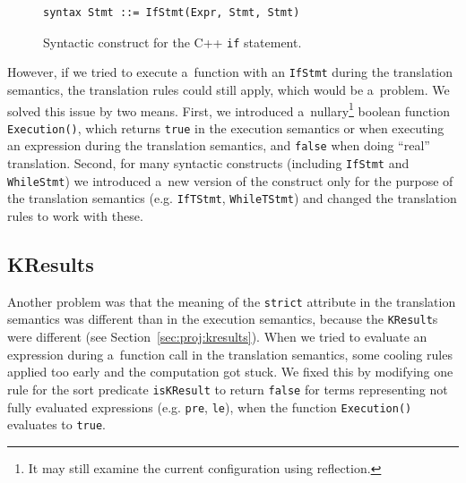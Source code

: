 \documentclass[nolot,nolof,nocover,printed]{fithesis3}
\begin{document}
\begin{figure}[ht]
\begin{lstlisting}
syntax Stmt ::= IfStmt(Expr, Stmt, Stmt)
\end{lstlisting}
\caption{Syntactic construct for the C++ \lstinline|if| statement.}
\label{fig:ifStmt}
\end{figure}

However, if we tried to execute a~function with an \lstinline|IfStmt| during the translation semantics, the translation rules could still apply, which would be a~problem. We solved this issue by two means. First, we introduced a~nullary\footnote{It may still examine the current configuration using reflection.} boolean function \lstinline|Execution()|, which returns \lstinline|true| in the execution semantics or when executing an expression during the translation semantics, and \lstinline|false| when doing \enquote{real} translation. Second, for many syntactic constructs (including \lstinline|IfStmt| and \lstinline|WhileStmt|) we introduced a~new version of the construct only for the purpose of the translation semantics (e.g. \lstinline|IfTStmt|, \lstinline|WhileTStmt|) and changed the translation rules to work with these.

\subsection{KResults}

Another problem was that the meaning of the \lstinline|strict| attribute in the translation semantics was different than in the execution semantics, because the \lstinline|KResult|s were different (see Section~\ref{sec:proj:kresults}). When we tried to evaluate an expression during a~function call in the translation semantics, some cooling rules applied too early and the computation got stuck. We fixed this by modifying one rule for the sort predicate \lstinline|isKResult| to return \lstinline|false| for terms representing not fully evaluated expressions (e.g. \lstinline|pre|, \lstinline|le|), when the function \lstinline|Execution()| evaluates to \lstinline|true|.



\end{document}
